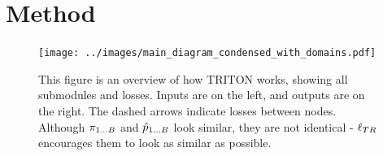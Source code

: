 \documentclass{article}
\begin{document}


\section{Method}
\label{sec:method}


\begin{figure}[H]
	\begin{center}
		\texttt{[image: ../images/main\_diagram\_condensed\_with\_domains.pdf]}
	\end{center}
	\caption{
		This figure is an overview of how TRITON works, showing all submodules and losses.
		Inputs are on the left, and outputs are on the right.
		The dashed arrows indicate losses between nodes.
		Although $\pi_{1\dots B}$ and $\hat{p}_{1\dots B}$ look similar, they are not identical - $\ell_{TR}$ encourages them to look as similar as possible.
	}
	\label{fig:main_diagram}
\end{figure}
\end{document}
